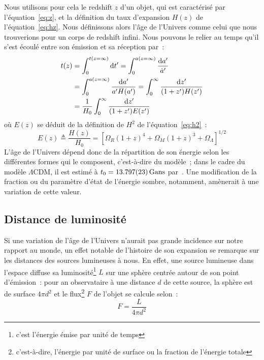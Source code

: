 \documentclass[../main/main.tex]{subfiles}
\begin{document}
Nous utilisons pour cela le redshift $z$ d'un objet, qui est caractérisé par
l'équation~\ref{eq:z}, et la définition du taux d'expansion $H(z)$ de
l'équation~\ref{eq:hz}. Nous définissons alors l'âge de l'Univers comme celui
que nous trouverions pour un corps de redshift infini. Nous pouvons le relier au
temps qu'il s'est écoulé entre son émission et sa réception par~:
\begin{align}
    t(z) & = \int_{0}^{t(z=\infty)} \mathrm{d} t' = \int_{0}^{a(z=\infty)} \frac{\mathrm{d} a'}{\dot{a}'}
    \nonumber\\
         & = \int_{0}^{a(z=\infty)} \frac{\mathrm{d} a'}{a'H(a')} = \int_{0}^{\infty} \frac{\mathrm{d}
         z'}{(1+z')H(z')}\nonumber\\
         & = \frac{1}{H_0} \int_{0}^{\infty} \frac{\mathrm{d} z'}{(1+z')E(z')}
\end{align}
où $E(z)$ se déduit de la définition de $H^2$ de l'équation~\ref{eq:h2}~:
\begin{equation}\label{eq:ez}
    E(z) \triangleq \frac{H(z)}{H_0} = \left[ \Omega_R(1+z)^4 + \Omega_M(1+z)^3
    + \Omega_\Lambda\right]^{1/2}
\end{equation}
L'âge de l'Univers dépend donc de la répartition de son énergie selon les
différentes formes qui le composent, c'est-à-dire du modèle~; dans le cadre du
modèle $\Lambda$CDM, il est estimé à $t_0 = \SI{13.797\pm0.023}{Gans}$
par~\cite{planck2018}. Une modification de la fraction ou du paramètre d'état de
l'énergie sombre, notamment, amènerait à une variation de cette valeur.

\subsection{Distance de luminosité}\label{ssec:dl}

Si une variation de l'âge de l'Univers n'aurait pas grande incidence sur notre
rapport au monde, un effet notable de l'histoire de son expansion se remarque
sur les distances des sources lumineuses à nous. En effet, une source lumineuse
dans l'espace diffuse sa luminosité\footnote{c'est l'énergie émise par unité de
temps} $L$ sur une sphère centrée autour de son point d'émission~: pour an
observataire à une distance $d$ de cette source, la sphère est de surface $4\pi
d^2$ et le flux\footnote{c'est-à-dire, l'énergie par unité de surface ou la
fraction de l'énergie totale} $F$ de l'objet se calcule selon~:
\begin{equation}\label{eq:f}
    F = \frac{L}{4\pi d^2}
\end{equation}
\end{document}
